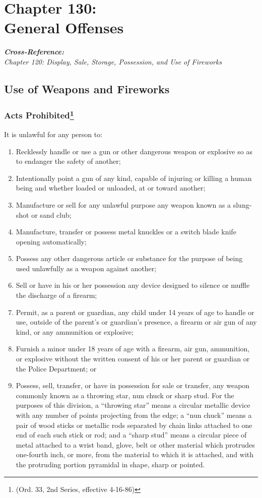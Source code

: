 \chapter*{Chapter 130: \\
	General Offenses}
    \minitoc
    \emph{\textbf{Cross-Reference:}\\
        {\indent}Chapter 120: Display, Sale, Storage, Possession, and Use of Fireworks}\\
    \pagebreak

\section{Use of Weapons and Fireworks}
\subsection{Acts Prohibited\footnote{(Ord. 33, 2nd Series, effective 4-16-86)}}
It is unlawful for any person to:
\begin{enumerate}[{\indent}1)]
    \item Recklessly handle or use a gun or other dangerous weapon or explosive so as to endanger the safety of another;
    \item Intentionally point a gun of any kind, capable of injuring or killing a human being and whether loaded or unloaded, at or toward another;
    \item Manufacture or sell for any unlawful purpose any weapon known as a slung-shot or sand club;
    \item Manufacture, transfer or possess metal knuckles or a switch blade knife opening automatically;
    \item Possess any other dangerous article or substance for the purpose of being used unlawfully as a weapon against another;
    \item Sell or have in his or her possession any device designed to silence or muffle the discharge of a firearm;
    \item Permit, as a parent or guardian, any child under 14 years of age to handle or use, outside of the parent’s or guardian’s presence, a firearm or air gun of any kind, or any ammunition or explosive;
    \item Furnish a minor under 18 years of age with a firearm, air gun, ammunition, or explosive without the written consent of his or her parent or guardian or the Police Department; or
    \item Possess, sell, transfer, or have in possession for sale or transfer, any weapon commonly known as a throwing star, nun chuck or sharp stud.  For the purposes of this division,  a “throwing star” means a circular metallic device with any number of points projecting from the edge; a “nun chuck” means a pair of wood sticks or metallic rods separated by chain links attached to one end of each such stick or rod; and a “sharp stud” means a circular piece of metal attached to a wrist band, glove, belt or other material which protrudes one-fourth inch, or more, from the material to which it is attached, and with the protruding portion pyramidal in shape, sharp or pointed.
\end{enumerate}
